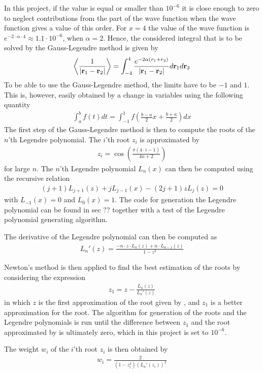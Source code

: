 In this project, if the value is equal or smaller than $10^{-6}$ it is close enough to zero to neglect contributions from the part of the wave function when the wave function gives a value of this order.
For $x=4$ the value of the wave function is $e^{-2\cdot \alpha \cdot 4} \approx 1.1\cdot 10^{-6}$, when $\alpha = 2$.
Hence, the considered integral that is to be solved by the Gauss-Legendre method is given by
\begin{align}
   \left< \frac{1}{| \mbox{\textbf{r}}_1 - \mbox{\textbf{r}}_2 |} \right> 
   = \int _{-4} ^{4} \frac{e^{-2\alpha (r_1+r_2)}}{| \mbox{\textbf{r}}_1 - \mbox{\textbf{r}}_2 |} d \mbox{\textbf{r}}_1 d\mbox{\textbf{r}}_2
\label{eq:GLdMethod1}
\end{align} 
To be able to use the Gauss-Legendre method, the limits have to be $-1$ and $1$. 
This is, however, easily obtained by a change in variables using the following quantity
\begin{align}
	\int _a ^b f(t) dt = \int _{-1} ^1 f \left( \frac{b-a}{2} x + \frac{b+a}{2} \right) dx
	\label{eq:GLdMethod2}
\end{align} 
The first step of the Gauss-Legendre method is then to compute the roots of the $n$'th Legendre polynomial.
The $i$'th root $z_i$ is approximated by
\begin{align}
	z_i = \cos \left( \frac{\pi (4\cdot i - 1)}{4n+2} \right)
	\label{eq:GLdMethod3}
\end{align} 
for large $n$.
The $n$'th Legendre polynomial $L_n(x)$ can then be computed using the recursive relation
\begin{align}
	(j+1)L_{j+1} (z) + j L_{j-1} (x) -(2j+1) z L_j (z) = 0
	\label{eq:GLdMethod4}
\end{align} 
with $L_{-1} (x) = 0$ and $L_0 (x) = 1$.
The code for generation the Legendre polynomial can be found in sec ??  together with a test of the Legendre polynomial generating algorithm.

The derivative of the Legendre polynomial can then be computed as
\begin{align}
	L_n '(z) = \frac{-n\cdot z \cdot L_n (z) +n \cdot L_{n-1} (z)}{1-z^2} 
	\label{eq:GLdMethod4a}
\end{align}

Newton's method is then applied to find the best estimation of the roots by considering the expression
\begin{align}
	z_1 = z- \frac{L_n(z)}{L_n'(z)}
	\label{eq:GLdMethod5}
\end{align}
in which $z$ is the first approximation of the root given by , and $z_1$ is a better approximation for the root. 
The algorithm for generation of the roots and the Legendre polynomials is run until the difference between $z_1$ and the root approximated by  is ultimately zero, which in this project is set to $10^{-6}$.

The weight $w_i$ of the $i$'th root $z_i$ is then obtained by
\begin{align}
	w_i = \frac{2}{(1-z_i^2)(L_n'(z_i))^2}
	\label{eq:GLdMethod6}
\end{align}
  

